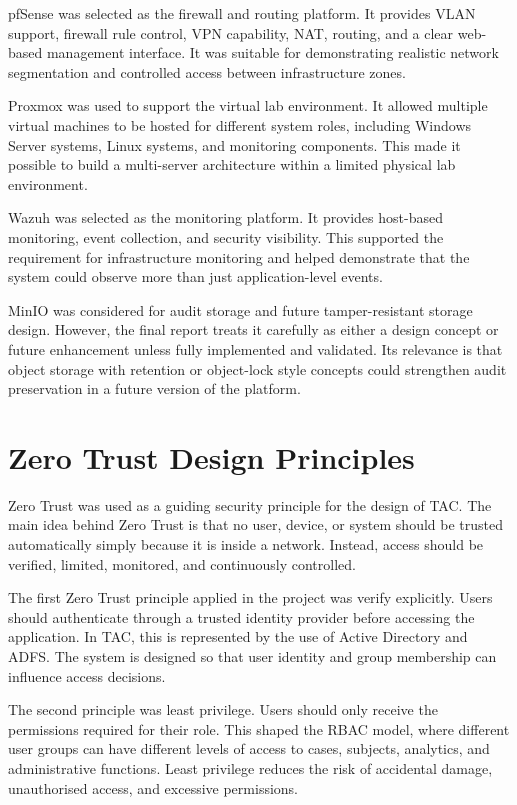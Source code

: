 pfSense was selected as the firewall and routing platform. It provides VLAN support, firewall rule control, VPN capability, NAT, routing, and a clear web-based management interface. It was suitable for demonstrating realistic network segmentation and controlled access between infrastructure zones.

Proxmox was used to support the virtual lab environment. It allowed multiple virtual machines to be hosted for different system roles, including Windows Server systems, Linux systems, and monitoring components. This made it possible to build a multi-server architecture within a limited physical lab environment.

Wazuh was selected as the monitoring platform. It provides host-based monitoring, event collection, and security visibility. This supported the requirement for infrastructure monitoring and helped demonstrate that the system could observe more than just application-level events.

MinIO was considered for audit storage and future tamper-resistant storage design. However, the final report treats it carefully as either a design concept or future enhancement unless fully implemented and validated. Its relevance is that object storage with retention or object-lock style concepts could strengthen audit preservation in a future version of the platform.


\section{Zero Trust Design Principles}

Zero Trust was used as a guiding security principle for the design of TAC. The main idea behind Zero Trust is that no user, device, or system should be trusted automatically simply because it is inside a network. Instead, access should be verified, limited, monitored, and continuously controlled.

The first Zero Trust principle applied in the project was verify explicitly. Users should authenticate through a trusted identity provider before accessing the application. In TAC, this is represented by the use of Active Directory and ADFS. The system is designed so that user identity and group membership can influence access decisions.

The second principle was least privilege. Users should only receive the permissions required for their role. This shaped the RBAC model, where different user groups can have different levels of access to cases, subjects, analytics, and administrative functions. Least privilege reduces the risk of accidental damage, unauthorised access, and excessive permissions.

